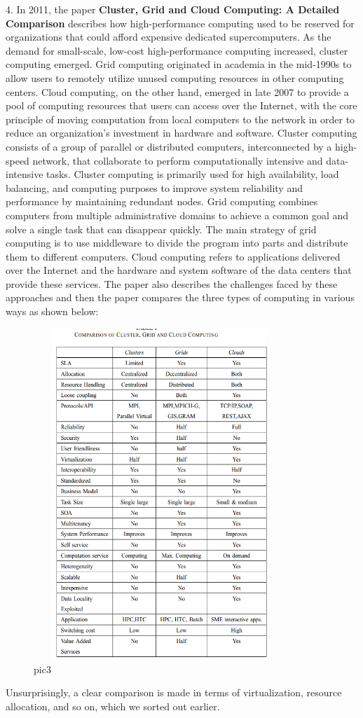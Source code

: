 \documentclass[a4paper,twoside]{scrbook}
\begin{document}
\begin{CJK}{UTF8}{gbsn}
4. In 2011, the paper \textbf{Cluster, Grid and Cloud Computing: A Detailed Comparison}\cite{sadashiv2011cluster} describes how high-performance computing used to be reserved for organizations that could afford expensive dedicated supercomputers. As the demand for small-scale, low-cost high-performance computing increased, cluster computing emerged. Grid computing originated in academia in the mid-1990s to allow users to remotely utilize unused computing resources in other computing centers. Cloud computing, on the other hand, emerged in late 2007 to provide a pool of computing resources that users can access over the Internet, with the core principle of moving computation from local computers to the network in order to reduce an organization's investment in hardware and software. Cluster computing consists of a group of parallel or distributed computers, interconnected by a high-speed network, that collaborate to perform computationally intensive and data-intensive tasks. Cluster computing is primarily used for high availability, load balancing, and computing purposes to improve system reliability and performance by maintaining redundant nodes. Grid computing combines computers from multiple administrative domains to achieve a common goal and solve a single task that can disappear quickly. The main strategy of grid computing is to use middleware to divide the program into parts and distribute them to different computers. Cloud computing refers to applications delivered over the Internet and the hardware and system software of the data centers that provide these services. The paper also describes the challenges faced by these approaches and then the paper compares the three types of computing in various ways as shown below:
\begin{figure}
\centering
\includegraphics[height=12.5cm,width=9.5cm]{c c g compaerd.png}
\caption{pic3}
\end{figure}
Unsurprisingly, a clear comparison is made in terms of virtualization, resource allocation, and so on, which we sorted out earlier.



\end{CJK}
\end{document}
